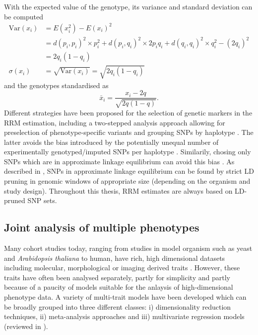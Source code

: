 %
With the expected value of the genotype, its variance and standard deviation can be computed
\begin{align}
\text{Var}(x_i) &= E(x_i^2) - E(x_i)^2 \\
&= d(p_i,p_i)^2 \times  p_i^2 + d(p_i,q_i)^2  \times 2p_iq_i + d(q_i,q_i)^2  \times q_i^2 - (2q_i)^2 \\
&=  2q_i(1-q_i) \\
\sigma(x_i) &= \sqrt{\text{Var}(x_i)} = \sqrt{2q_i(1-q_i)}
\end{align}
%
and the genotypes standardised as
\begin{equation}
\bar{x}_i = \frac{x_i - 2q}{\sqrt{2q(1-q)}}.
\end{equation}
%
Different strategies have been proposed for the selection of genetic markers in the RRM estimation, including a two-stepped analysis approach allowing for preselection of phenotype-specific variants \citep{Lippert2013} and grouping SNPs by haplotype \citep{Zhao2007,Kang2008}. The latter avoids the bias introduced by the potentially unequal number of experimentally genotyped/imputed SNPs per haplotype \citep{Speed2017}. Similarily, chosing only SNPs which are in approximate linkage equilibrium can avoid this bias \citep{Browning2008}. As described in \citep{Eu-ahsunthornwattana2014}, SNPs in approximate linkage equilibrium can be found by strict LD pruning in genomic windows of appropriate size (depending on the organism and study design). Throughout this thesis, RRM estimates are always based on LD-pruned SNP sets.  

\subsection{Joint analysis of multiple phenotypes}
\label{subsection:joint-analysis}
Many cohort studies today, ranging from studies in model organism such as yeast and \textit{Arabidopsis thaliana} to human, have rich, high dimensional datasets including molecular, morphological or imaging derived traits \citep{Bloom2013,Atwell2010,Astle2009,Shaffer2016,Stein2010}. However, these traits have often been analysed separately,  partly for simplicity and partly because of a paucity of models suitable for the anlaysis of high-dimensional phenotype data. A variety of multi-trait models have been developed which can be broadly grouped into three different classes: i) dimensionality reduction techniques, ii) meta-analysis approaches and iii) multivariate regression models (reviewed in \citep{Shriner2012,Yang2012b}). 

